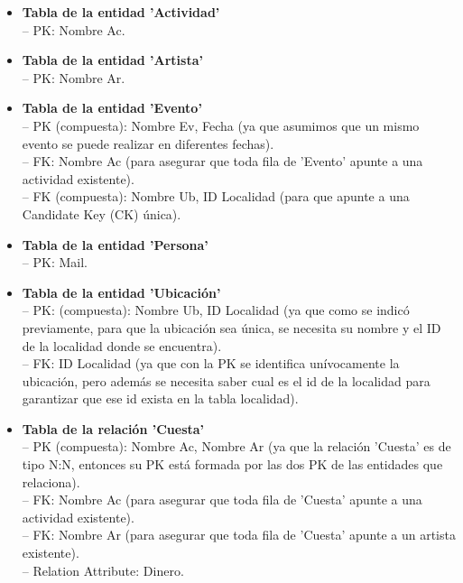 \documentclass[12pt]{article}
\begin{document}
    \begin{itemize}

        \item \textbf{Tabla de la entidad 'Actividad'} \\
            -- PK: Nombre Ac.
        
        \item \textbf{Tabla de la entidad 'Artista'} \\
            -- PK: Nombre Ar.
            
        \item \textbf{Tabla de la entidad 'Evento'} \\
            -- PK (compuesta): Nombre Ev, Fecha (ya que asumimos que un mismo evento se puede realizar en diferentes fechas). \\
            -- FK: Nombre Ac (para asegurar que toda fila de 'Evento' apunte a una actividad existente). \\
            -- FK (compuesta): Nombre Ub, ID Localidad (para que apunte a una Candidate Key (CK) única).
            
        \item \textbf{Tabla de la entidad 'Persona'} \\
            -- PK: Mail.
            
        \item \textbf{Tabla de la entidad 'Ubicación'} \\
            -- PK: (compuesta): Nombre Ub, ID Localidad (ya que como se indicó previamente, para que la ubicación sea única, se necesita su nombre y 
            el ID de la localidad donde se encuentra). \\
            -- FK: ID Localidad (ya que con la PK se identifica unívocamente la ubicación, pero además se necesita saber cual es el id de la localidad 
            para garantizar que ese id exista en la tabla localidad).
            
        \item \textbf{Tabla de la relación 'Cuesta'} \\
            -- PK (compuesta): Nombre Ac, Nombre Ar (ya que la relación 'Cuesta' es de tipo N:N, entonces su PK está formada por las dos PK de las 
            entidades que relaciona). \\
            -- FK: Nombre Ac (para asegurar que toda fila de 'Cuesta' apunte a una actividad existente). \\
            -- FK: Nombre Ar (para asegurar que toda fila de 'Cuesta' apunte a un artista existente). \\
            -- Relation Attribute: Dinero.
            

\end{itemize}
\end{document}
